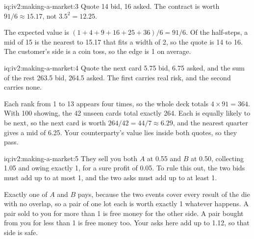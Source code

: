 \begin{solution}{iq:iv2:making-a-market:3}
Quote 14 bid, 16 asked. The contract is worth $91/6 \approx 15.17$, not $3.5^2 = 12.25$.

The expected value is $(1 + 4 + 9 + 16 + 25 + 36)/6 = 91/6$. Of the half-steps, a mid of 15 is the nearest to 15.17 that fits a width of 2, so the quote is 14 to 16. The customer's side is a coin toss, so the edge is 1 on average.

\end{solution}

\begin{solution}{iq:iv2:making-a-market:4}
Quote the next card 5.75 bid, 6.75 asked, and the sum of the rest 263.5 bid, 264.5 asked. The first carries real risk, and the second carries none.

Each rank from 1 to 13 appears four times, so the whole deck totals $4 \times 91 = 364$. With 100 showing, the 42 unseen cards total exactly 264. Each is equally likely to be next, so the next card is worth $264/42 = 44/7 \approx 6.29$, and the nearest quarter gives a mid of 6.25. Your counterparty's value lies inside both quotes, so they pass.

\end{solution}

\begin{solution}{iq:iv2:making-a-market:5}
They sell you both $A$ at 0.55 and $B$ at 0.50, collecting 1.05 and owing exactly 1, for a sure profit of 0.05. To rule this out, the two bids must add up to at most 1, and the two asks must add up to at least 1.

Exactly one of $A$ and $B$ pays, because the two events cover every result of the die with no overlap, so a pair of one lot each is worth exactly 1 whatever happens. A pair sold to you for more than 1 is free money for the other side. A pair bought from you for less than 1 is free money too. Your asks here add up to 1.12, so that side is safe.

\end{solution}

